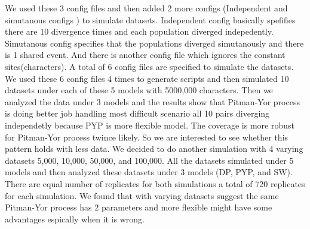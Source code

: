 We used these 3 config files and then added 2 more configs (Independent and simutanous configs ) to simulate datasets. Independent config 
basically spefifies there are 10 divergence times and each population diverged indepedently. Simutanous config specifies that the populations 
diverged simutanously and there is 1 shared event. And there is another config file which ignores the constant sites(characters). A total of 6 config 
files are specified to simulate the datasets. We used these 6 config files 4 times to generate scripts and then simulated 10 datasets under each of 
these 5 models with 5000,000 characters. Then we analyzed the data under 3 models and the results show that Pitman-Yor process is doing better job handling 
most difficult scenario all 10 pairs diverging independetly because PYP is more flexible model. The coverage is more robust for Pitman-Yor process twince likely.
So we are interested to see whether this pattern holds with less data. We decided to do another simulation with 4 varying datasets 5,000, 10,000, 50,000, and 100,000. 
All the datasets simulated under 5 models and then analyzed these datasets under 3 models (DP, PYP, and SW). There are equal number of replicates for both simulations 
a total of 720 replicates for each simulation. We found that with varying datasets suggest the same Pitman-Yor process has 2 parameters and more flexible might 
have some advantages espically when it is wrong.
 

 



 
 
      

